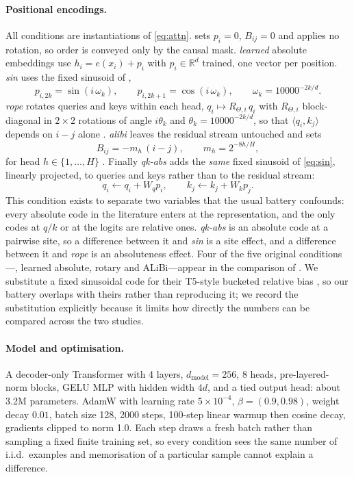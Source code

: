 \paragraph{Positional encodings.} All conditions are instantiations of
\eqref{eq:attn}. \nope{} sets $p_i=0$, $B_{ij}=0$ and applies no rotation, so
order is conveyed only by the causal mask. \emph{learned} absolute embeddings use
$h_i=e(x_i)+p_i$ with $p_i\in\mathbb{R}^{d}$ trained, one vector per position.
\emph{sin} uses the fixed sinusoid of \citet{vaswani2017attention},
\begin{equation}
p_{i,2k}=\sin\!\left(i\,\omega_k\right),\qquad
p_{i,2k+1}=\cos\!\left(i\,\omega_k\right),\qquad
\omega_k=10000^{-2k/d}.
\label{eq:sin}
\end{equation}
\emph{rope} rotates queries and keys within each head,
$q_i\mapsto R_{\Theta,i}\,q_i$ with $R_{\Theta,i}$ block-diagonal in
$2\times2$ rotations of angle $i\theta_k$ and $\theta_k=10000^{-2k/d}$, so that
$\langle q_i,k_j\rangle$ depends on $i-j$ alone \citep{su2024roformer}.
\emph{alibi} leaves the residual stream untouched and sets
\begin{equation}
B_{ij}=-m_h\,(i-j),\qquad m_h=2^{-8h/H},
\label{eq:alibi}
\end{equation}
for head $h\in\{1,\dots,H\}$ \citep{press2022train}. Finally \emph{qk-abs} adds the
\emph{same} fixed sinusoid of \eqref{eq:sin}, linearly projected, to queries and
keys rather than to the residual stream:
\begin{equation}
q_i \leftarrow q_i + W_q p_i,\qquad k_j \leftarrow k_j + W_k p_j .
\label{eq:qkabs}
\end{equation}
This condition exists to separate two variables that the usual battery confounds:
every absolute code in the literature enters at the representation, and the only
codes at $q/k$ or at the logits are relative ones. \emph{qk-abs} is an absolute
code at a pairwise site, so a difference between it and \emph{sin} is a site
effect, and a difference between it and \emph{rope} is an absoluteness effect.
Four of the five original conditions---\nope{}, learned absolute, rotary and
ALiBi---appear in the comparison of \citet{kazemnejad2023impact}. We substitute a
fixed sinusoidal code for their T5-style bucketed relative bias
\citep{raffel2020exploring}, so our battery overlaps with theirs rather than
reproducing it; we record the substitution explicitly because it limits how
directly the numbers can be compared across the two studies.

\paragraph{Model and optimisation.} A decoder-only Transformer with 4 layers,
$d_{\mathrm{model}}{=}256$, 8 heads, pre-layered-norm blocks, GELU MLP with hidden
width $4d$, and a tied output head: about 3.2M parameters. AdamW with learning rate
$5\times10^{-4}$, $\beta=(0.9,0.98)$, weight decay $0.01$, batch size 128, 2000
steps, 100-step linear warmup then cosine decay, gradients clipped to norm 1.0.
Each step draws a fresh batch rather than sampling a fixed finite training set, so
every condition sees the same number of i.i.d.\ examples and memorisation of a
particular sample cannot explain a difference.

